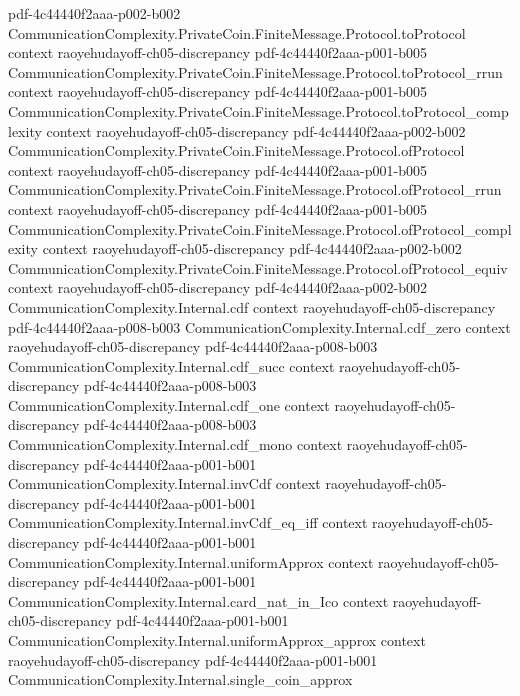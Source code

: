 \begin{lemma}
  {pdf-4c44440f2aaa-p002-b002}
\proofstep
  {CommunicationComplexity.PrivateCoin.FiniteMessage.Protocol.toProtocol}
  {context}
  {raoyehudayoff-ch05-discrepancy}
  {pdf-4c44440f2aaa-p001-b005}
\proofstep
  {CommunicationComplexity.PrivateCoin.FiniteMessage.Protocol.toProtocol_rrun}
  {context}
  {raoyehudayoff-ch05-discrepancy}
  {pdf-4c44440f2aaa-p001-b005}
\proofstep
  {CommunicationComplexity.PrivateCoin.FiniteMessage.Protocol.toProtocol_complexity}
  {context}
  {raoyehudayoff-ch05-discrepancy}
  {pdf-4c44440f2aaa-p002-b002}
\proofstep
  {CommunicationComplexity.PrivateCoin.FiniteMessage.Protocol.ofProtocol}
  {context}
  {raoyehudayoff-ch05-discrepancy}
  {pdf-4c44440f2aaa-p001-b005}
\proofstep
  {CommunicationComplexity.PrivateCoin.FiniteMessage.Protocol.ofProtocol_rrun}
  {context}
  {raoyehudayoff-ch05-discrepancy}
  {pdf-4c44440f2aaa-p001-b005}
\proofstep
  {CommunicationComplexity.PrivateCoin.FiniteMessage.Protocol.ofProtocol_complexity}
  {context}
  {raoyehudayoff-ch05-discrepancy}
  {pdf-4c44440f2aaa-p002-b002}
\proofstep
  {CommunicationComplexity.PrivateCoin.FiniteMessage.Protocol.ofProtocol_equiv}
  {context}
  {raoyehudayoff-ch05-discrepancy}
  {pdf-4c44440f2aaa-p002-b002}
\proofstep
  {CommunicationComplexity.Internal.cdf}
  {context}
  {raoyehudayoff-ch05-discrepancy}
  {pdf-4c44440f2aaa-p008-b003}
\proofstep
  {CommunicationComplexity.Internal.cdf_zero}
  {context}
  {raoyehudayoff-ch05-discrepancy}
  {pdf-4c44440f2aaa-p008-b003}
\proofstep
  {CommunicationComplexity.Internal.cdf_succ}
  {context}
  {raoyehudayoff-ch05-discrepancy}
  {pdf-4c44440f2aaa-p008-b003}
\proofstep
  {CommunicationComplexity.Internal.cdf_one}
  {context}
  {raoyehudayoff-ch05-discrepancy}
  {pdf-4c44440f2aaa-p008-b003}
\proofstep
  {CommunicationComplexity.Internal.cdf_mono}
  {context}
  {raoyehudayoff-ch05-discrepancy}
  {pdf-4c44440f2aaa-p001-b001}
\proofstep
  {CommunicationComplexity.Internal.invCdf}
  {context}
  {raoyehudayoff-ch05-discrepancy}
  {pdf-4c44440f2aaa-p001-b001}
\proofstep
  {CommunicationComplexity.Internal.invCdf_eq_iff}
  {context}
  {raoyehudayoff-ch05-discrepancy}
  {pdf-4c44440f2aaa-p001-b001}
\proofstep
  {CommunicationComplexity.Internal.uniformApprox}
  {context}
  {raoyehudayoff-ch05-discrepancy}
  {pdf-4c44440f2aaa-p001-b001}
\proofstep
  {CommunicationComplexity.Internal.card_nat_in_Ico}
  {context}
  {raoyehudayoff-ch05-discrepancy}
  {pdf-4c44440f2aaa-p001-b001}
\proofstep
  {CommunicationComplexity.Internal.uniformApprox_approx}
  {context}
  {raoyehudayoff-ch05-discrepancy}
  {pdf-4c44440f2aaa-p001-b001}
\proofstep
  {CommunicationComplexity.Internal.single_coin_approx}

\end{lemma}
